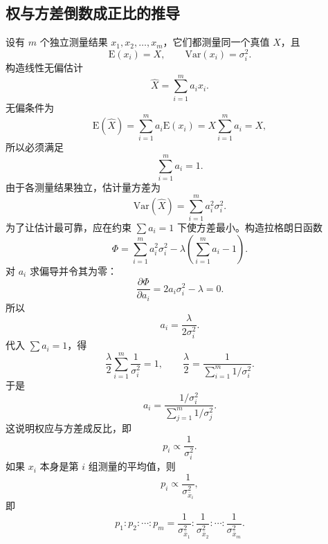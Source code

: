 \documentclass[UTF8,12pt,a4paper]{ctexart}
\newcommand{\E}{\mathrm{E}}
\newcommand{\Var}{\mathrm{Var}}
\begin{document}
\subsection{权与方差倒数成正比的推导}
设有 $m$ 个独立测量结果 $x_1,x_2,\ldots,x_m$，它们都测量同一个真值 $X$，且
\begin{equation*}
    \E(x_i)=X,
    \qquad
    \Var(x_i)=\sigma_i^2 .
\end{equation*}
构造线性无偏估计
\begin{equation*}
    \hat{X}=\sum_{i=1}^{m}a_i x_i .
\end{equation*}
无偏条件为
\begin{equation*}
    \E(\hat{X})=\sum_{i=1}^{m}a_i\E(x_i)=X\sum_{i=1}^{m}a_i=X,
\end{equation*}
所以必须满足
\begin{equation*}
    \sum_{i=1}^{m}a_i=1 .
\end{equation*}
由于各测量结果独立，估计量方差为
\begin{equation*}
    \Var(\hat{X})=\sum_{i=1}^{m}a_i^2\sigma_i^2 .
\end{equation*}
为了让估计最可靠，应在约束 $\sum a_i=1$ 下使方差最小。构造拉格朗日函数
\begin{equation*}
    \Phi=\sum_{i=1}^{m}a_i^2\sigma_i^2-\lambda\left(\sum_{i=1}^{m}a_i-1\right) .
\end{equation*}
对 $a_i$ 求偏导并令其为零：
\begin{equation*}
    \frac{\partial\Phi}{\partial a_i}=2a_i\sigma_i^2-\lambda=0 .
\end{equation*}
所以
\begin{equation*}
    a_i=\frac{\lambda}{2\sigma_i^2} .
\end{equation*}
代入 $\sum a_i=1$，得
\begin{equation*}
    \frac{\lambda}{2}\sum_{i=1}^{m}\frac{1}{\sigma_i^2}=1,
    \qquad
    \frac{\lambda}{2}=\frac{1}{\sum_{i=1}^{m}1/\sigma_i^2} .
\end{equation*}
于是
\begin{equation*}
    a_i=\frac{1/\sigma_i^2}{\sum_{j=1}^{m}1/\sigma_j^2} .
\end{equation*}
这说明权应与方差成反比，即
\begin{equation*}
    p_i\propto \frac{1}{\sigma_i^2} .
\end{equation*}
如果 $x_i$ 本身是第 $i$ 组测量的平均值，则
\begin{equation*}
    p_i\propto \frac{1}{\sigma_{\bar{x}_i}^2},
\end{equation*}
即
\begin{equation*}
    p_1:p_2:\cdots:p_m
    =\frac{1}{\sigma_{\bar{x}_1}^2}:\frac{1}{\sigma_{\bar{x}_2}^2}:\cdots:\frac{1}{\sigma_{\bar{x}_m}^2} .
\end{equation*}
\end{document}
